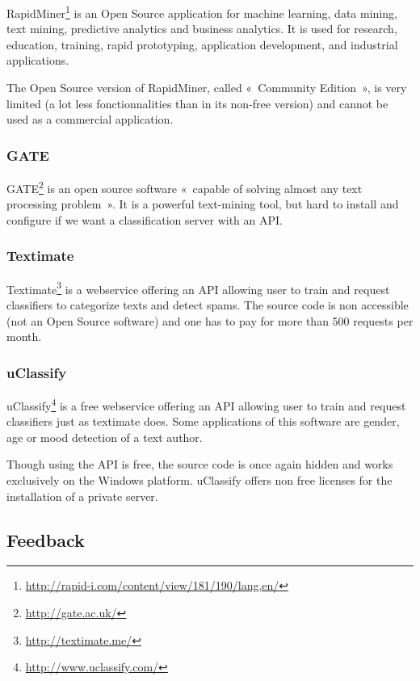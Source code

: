 \documentclass[a4paper,11pt]{article}
\begin{document}
RapidMiner\footnote{\url{http://rapid-i.com/content/view/181/190/lang,en/}} is
an Open Source application for machine learning, data mining, text
mining, predictive analytics and business analytics.
It is used for research, education, training, rapid prototyping, application
development, and industrial applications.

The Open Source version of RapidMiner, called «~Community Edition~», is very
limited (a lot less fonctionnalities than in its non-free version) and cannot
be used as a commercial application.

\subsubsection{GATE}

GATE\footnote{\url{http://gate.ac.uk/}} is an open source software «~capable
of solving almost any text processing problem~». It is a powerful text-mining
tool, but hard to install and configure if we want a classification server
with an API.

\subsubsection{Textimate}

Textimate\footnote{\url{http://textimate.me/}} is a webservice offering an API
allowing user to train and request classifiers to categorize texts and detect
spams. The source code is non accessible (not an Open Source software) and one
has to pay for more than 500 requests per month.

\subsubsection{uClassify}

uClassify\footnote{\url{http://www.uclassify.com/}} is a free webservice
offering an API allowing user to train and request classifiers just as
textimate does. Some applications of this software are gender, age or mood
detection of a text author.

Though using the API is free, the source code is once again hidden and works
exclusively on the Windows platform. uClassify offers non free licenses for
the installation of a private server.

\subsection{Feedback}
\end{document}

